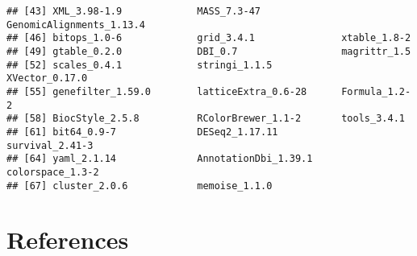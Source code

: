\documentclass{article}\usepackage[]{graphicx}\usepackage[usenames,dvipsnames]{color}
\makeatletter
\newenvironment{kframe}{%
 \def\at@end@of@kframe{}%
 \ifinner\ifhmode%
  \def\at@end@of@kframe{\end{minipage}}%
  \begin{minipage}{\columnwidth}%
 \fi\fi%
 \def\FrameCommand##1{\hskip\@totalleftmargin \hskip-\fboxsep
 \colorbox{shadecolor}{##1}\hskip-\fboxsep
     \hskip-\linewidth \hskip-\@totalleftmargin \hskip\columnwidth}%
 \MakeFramed {\advance\hsize-\width
   \@totalleftmargin\z@ \linewidth\hsize
   \@setminipage}}%
 {\par\unskip\endMakeFramed%
 \at@end@of@kframe}
\newenvironment{knitrout}{}{} %
\makeatother
\begin{document}
\begin{knitrout}
\begin{kframe}
\begin{verbatim}
## [43] XML_3.98-1.9             MASS_7.3-47              GenomicAlignments_1.13.4
## [46] bitops_1.0-6             grid_3.4.1               xtable_1.8-2            
## [49] gtable_0.2.0             DBI_0.7                  magrittr_1.5            
## [52] scales_0.4.1             stringi_1.1.5            XVector_0.17.0          
## [55] genefilter_1.59.0        latticeExtra_0.6-28      Formula_1.2-2           
## [58] BiocStyle_2.5.8          RColorBrewer_1.1-2       tools_3.4.1             
## [61] bit64_0.9-7              DESeq2_1.17.11           survival_2.41-3         
## [64] yaml_2.1.14              AnnotationDbi_1.39.1     colorspace_1.3-2        
## [67] cluster_2.0.6            memoise_1.1.0
\end{verbatim}
\end{kframe}
\end{knitrout}

\section{References}
\begingroup
\renewcommand{\section}[2]{}%

\endgroup
\end{document}
